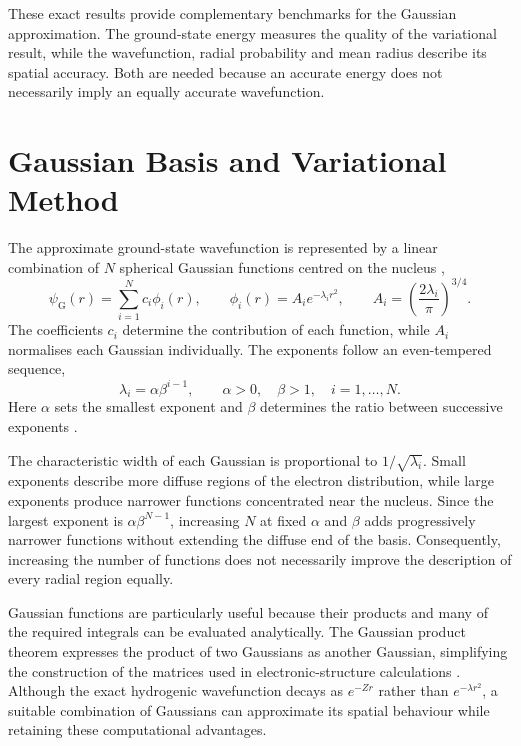These exact results provide complementary benchmarks
for the Gaussian approximation. The ground-state
energy measures the quality of the variational result,
while the wavefunction, radial probability and mean
radius describe its spatial accuracy. Both are needed
because an accurate energy does not necessarily
imply an equally accurate wavefunction.



\newpage
\section{Gaussian Basis and Variational Method}

The approximate ground-state wavefunction is
represented by a linear combination of $N$
spherical Gaussian functions centred on the
nucleus \cite{quiney_art_2018},
\begin{equation}
    \psi_{\mathrm G}(r)
    =\sum_{i=1}^{N}c_i\phi_i(r),
    \qquad
    \phi_i(r)=A_i e^{-\lambda_i r^2},
    \qquad
    A_i=\left(\frac{2\lambda_i}{\pi}\right)^{3/4}.
    \label{eq:gaussian_expansion}
\end{equation}
The coefficients $c_i$ determine the contribution
of each function, while $A_i$ normalises each
Gaussian individually. The exponents follow an
even-tempered sequence,
\begin{equation}
    \lambda_i=\alpha\beta^{i-1},
    \qquad
    \alpha>0,\quad\beta>1,\quad i=1,\ldots,N.
    \label{eq:exponent_sequence}
\end{equation}
Here $\alpha$ sets the smallest exponent and
$\beta$ determines the ratio between successive
exponents
\cite{quiney_art_2018,BaR,FellerRuedenberg1979,Wilson}.

The characteristic width of each Gaussian is
proportional to $1/\sqrt{\lambda_i}$. Small
exponents describe more diffuse regions of the
electron distribution, while large exponents
produce narrower functions concentrated near
the nucleus. Since the largest exponent is
$\alpha\beta^{N-1}$, increasing $N$ at fixed
$\alpha$ and $\beta$ adds progressively narrower
functions without extending the diffuse end of
the basis. Consequently, increasing the number
of functions does not necessarily improve the
description of every radial region equally.

Gaussian functions are particularly useful
because their products and many of the required
integrals can be evaluated analytically.
The Gaussian product theorem expresses the
product of two Gaussians as another Gaussian,
simplifying the construction of the matrices
used in electronic-structure calculations
\cite{quiney_art_2018}. Although the exact
hydrogenic wavefunction decays as $e^{-Zr}$
rather than $e^{-\lambda r^2}$, a suitable
combination of Gaussians can approximate its
spatial behaviour while retaining these
computational advantages.

